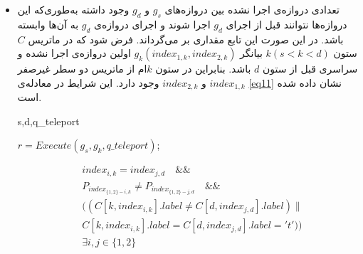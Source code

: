 \begin{itemize}
\item
تعدادی دروازه‌ی اجرا نشده بین دروازه‌های $g_{s}$ و $g_{d}$ وجود داشته به‌طوری‌که این دروازه‌ها نتوانند قبل از اجرای $g_{d}$ اجرا شوند و اجرای دروازه‌ی $g_{d}$ به آن‌ها وابسته باشد. در این صورت این تابع مقداری   بر می‌گرداند.  فرض شود که در ماتریس $C$ ستون $k (s < k <d)$ بیانگر $g_{k} (index_{1,k},index_{2,k})$ اولین دروازه‌ی اجرا نشده و سراسری قبل از ستون $d$ باشد. بنابراین در ستون $k$ام از ماتریس دو سطر غیرصفر $index_{1,k}$ و  $index_{2,k}$ وجود دارد. این شرایط در معادله‌ی \ref{eq11} نشان داده شده است.
\begin{latin}
\begin{algorithm}
{
\fontsize{9}{1}
\caption{Execute (s, d, q\_teleport)}
\begin{algorithmic}[1]
 {s,d,q\_teleport}
\EndIf
{}
\EndIf
{}
\Else
\EndIf
\Else
{}
\EndIf
\Else
{}
\EndIf
\EndWhile


\EndIf

\State $r= Execute (g_{s},g_{k},q\_teleport)$;
\EndIf
\EndFunction
\end{algorithmic}
}
\end{algorithm}
\end{latin}

\begin{equation}\begin{split}
& index_{i,k} = index_{j,d} \quad \&\&\\
& P_{index_{\{1,2\} - i,k}} \ne P_{index_{\{1,2\}-j,d}} \quad \&\&\\
&\biggl( (C[k,index_{i,k}].label \ne C[d,index_{j,d}].label) \| \\
&C[k,index_{i,k}].label = C[d,index_{j,d}].label='t')\biggr) \\
&\exists i,j \in \{1,2\}\\
\end{split}
\label{eq11}
\end{equation}



\end{itemize}
